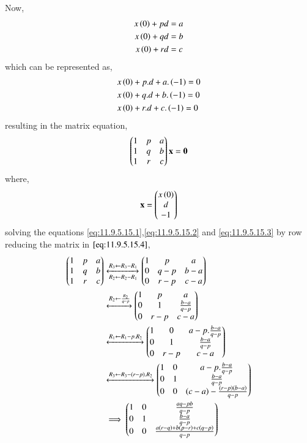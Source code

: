 \documentclass[journal,12pt,onecolumn]{IEEEtran}
\theoremstyle{remark}
\begin{document}
Now,
\begin{align}
    x\brak{0}+pd &= a \label{eq:11.9.5.15.1} \\
    x\brak{0}+qd &= b \label{eq:11.9.5.15.2} \\
    x\brak{0}+rd &= c \label{eq:11.9.5.15.3} 
\end{align}
which can be represented as,
\begin{align}
    &x\brak{0}+p.d+a.\brak{-1}=0\\
    &x\brak{0}+q.d+b.\brak{-1}=0\\
    &x\brak{0}+r.d+c.\brak{-1}=0
\end{align}
resulting in the matrix equation,
\begin{align}
    \myvec{1&p&a\\1&q&b\\1&r&c\\}\vec{x}=\vec{0}\label{eq:11.9.5.15.4}
\end{align}
where,
\begin{align}
    \vec{x}=\myvec{x\brak{0}\\d\\-1}
\end{align}
solving the equations \eqref{eq:11.9.5.15.1},\eqref{eq:11.9.5.15.2} and \eqref{eq:11.9.5.15.3} by row reducing the matrix in $\eqref{eq:11.9.5.15.4}$,
    \begin{align}
    \myvec{
        1&p&a\\
        1&q&b\\
        1&r&c\\
    }
    &\xleftrightarrow[R_{2}\leftarrow R_2 - R_1]{ R_{3}\leftarrow R_3 - R_1}
    \myvec{
        1&p&a\\
        0&q-p&b-a\\
        0&r-p&c-a\\
    }\\
   &\xleftrightarrow{R_{2}\leftarrow \frac{R_2}{q-p}} 
    \myvec{
        1&p&a\\
        0&1&\frac{b-a}{q-p}\\
        0&r-p&c-a\\
    }\\
    &\xleftrightarrow{R_1\leftarrow R_1 - p.R_2}
    \myvec{
       1&0&a- p. \frac{b-a}{q-p}\\
       0&1&\frac{b-a}{q-p}\\
       0&r-p&c-a\\
    }\\
    &\xleftrightarrow{R_{3}\leftarrow R_{3}-\brak{r-p}.R_2}
    \myvec{
       1&0&a- p. \frac{b-a}{q-p}\\
       0&1&\frac{b-a}{q-p}\\
       0&0&\brak{c-a} - \frac{\brak{r-p}\brak{b-a}}{q-p}\\
    }\\
    &\implies
    \myvec{
          1&0&\frac{aq-pb}{q-p}\\
       0&1&\frac{b-a}{q-p}\\
       0&0&\frac{a\brak{r-q} + b\brak{p-r} + c\brak{q-p}}{q-p}\\
    }
\end{align}
\end{document}
